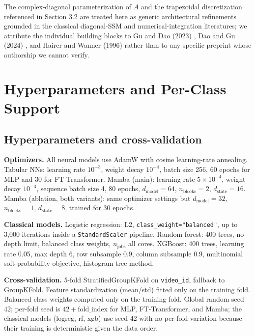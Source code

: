 \documentclass{article}
\begin{document}
The complex-diagonal parameterization of $A$ and the trapezoidal discretization referenced in Section 3.2 are treated here as generic architectural refinements grounded in the classical diagonal-SSM and numerical-integration literatures; we attribute the individual building blocks to Gu and Dao (2023) \cite{gu2023mamba}, Dao and Gu (2024) \cite{dao2024mamba2}, and Hairer and Wanner (1996) \cite{hairer1996} rather than to any specific preprint whose authorship we cannot verify.

\appendix

\section{Hyperparameters and Per-Class Support}

\subsection{Hyperparameters and cross-validation}

\textbf{Optimizers.} All neural models use AdamW with cosine learning-rate annealing. Tabular NNs: learning rate $10^{-3}$, weight decay $10^{-4}$, batch size 256, 60 epochs for MLP and 30 for FT-Transformer. Mamba (main): learning rate $5 \times 10^{-4}$, weight decay $10^{-3}$, sequence batch size 4, 80 epochs, $d_\text{model} = 64$, $n_\text{blocks} = 2$, $d_\text{state} = 16$. Mamba (ablation, both variants): same optimizer settings but $d_\text{model} = 32$, $n_\text{blocks} = 1$, $d_\text{state} = 8$, trained for 30 epochs.

\textbf{Classical models.} Logistic regression: L2, \texttt{class\_weight="balanced"}, up to 3,000 iterations inside a \texttt{StandardScaler} pipeline. Random forest: 400 trees, no depth limit, balanced class weights, $n_\text{jobs}$ all cores. XGBoost: 400 trees, learning rate 0.05, max depth 6, row subsample 0.9, column subsample 0.9, multinomial soft-probability objective, histogram tree method.

\textbf{Cross-validation.} 5-fold StratifiedGroupKFold on \texttt{video\_id}, fallback to GroupKFold. Feature standardization (mean/std) fitted only on the training fold. Balanced class weights computed only on the training fold. Global random seed 42; per-fold seed is $42 + \text{fold\_index}$ for MLP, FT-Transformer, and Mamba; the classical models (logreg, rf, xgb) use seed 42 with no per-fold variation because their training is deterministic given the data order.
\end{document}
